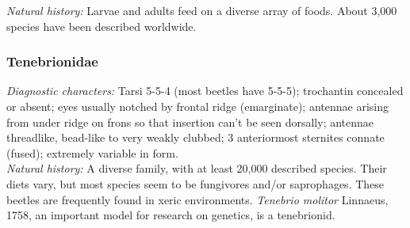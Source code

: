 \documentclass[letterpaper, 11pt]{article}
\begin{document}
\noindent{}\textit{Natural history:} Larvae and adults feed on a diverse array of foods. About 3,000 species have been described worldwide.

\subsubsection{Tenebrionidae}
\noindent{}\textit{Diagnostic characters:} Tarsi 5-5-4 (most beetles have 5-5-5); trochantin concealed or absent; eyes usually notched by frontal ridge (emarginate); antennae arising from under ridge on frons so that insertion can't be seen dorsally; antennae threadlike, bead-like to very weakly clubbed; 3 anteriormost sternites connate (fused); extremely variable in form.\\

\noindent{}\textit{Natural history:} A diverse family, with at least 20,000 described species. Their diets vary, but most species seem to be fungivores and/or saprophages. These beetles are frequently found in xeric environments. \textit{Tenebrio molitor} Linnaeus, 1758, an important model for research on genetics, is a tenebrionid.
\end{document}
